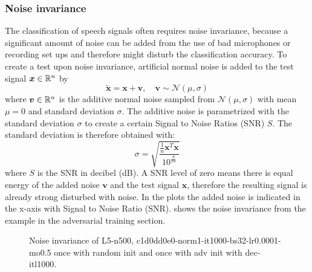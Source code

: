 \subsubsection{Noise invariance}
The classification of speech signals often requires noise invariance, because a significant amount of noise can be added from the use of bad microphones or recording set ups and therefore might disturb the classification accuracy.
To create a test upon noise invariance, artificial normal noise is added to the test signal $\bm{x} \in \mathbb{R}^n$ by
\begin{equation}
  \bm{\tilde{x}} = \bm{x} + \bm{v}, \quad \bm{v} \sim \mathcal{N}(\mu, \sigma)
\end{equation}
where $\bm{v} \in \mathbb{R}^n$ is the additive normal noise sampled from $\mathcal{N}(\mu, \sigma)$ with mean $\mu = 0$ and standard deviation $\sigma$.
The additive noise is parametrized with the standard deviation $\sigma$ to create a certain Signal to Noise Ratios (SNR) $S$.
The standard deviation is therefore obtained with:
\begin{equation}
  \sigma = \sqrt{\frac{\frac{1}{n}\bm{x}^T \bm{x}}{10^{\frac{S}{10}}}}
\end{equation}
where $S$ is the SNR in decibel (dB). 
A SNR level of zero means there is equal energy of the added noise $\bm{v}$ and the test signal $\bm{x}$, therefore the resulting signal is already strong disturbed with noise.
In the plots the added noise is indicated in the x-axis with Signal to Noise Ratio (SNR).
 shows the noise invariance from the example in the adversarial training section.
\begin{figure}[!ht]
  \centering
  \caption{Noise invariance of L5-n500, c1d0dd0e0-norm1-it1000-bs32-lr0.0001-mo0.5 once with random init and once with adv init with dec-itl1000.}
  \label{fig:exp_tb_noise_fc3}
\end{figure}
\FloatBarrier
\noindent

